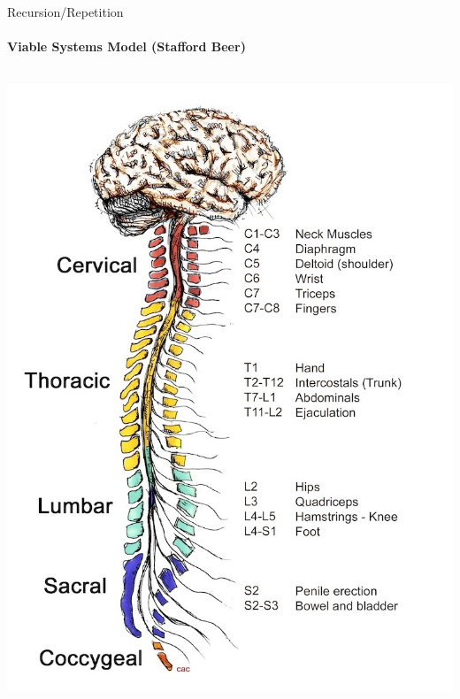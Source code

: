 \documentclass[
	11pt,
	aspectratio=169,
]{beamer}
\begin{document}
                \begin{frame}{Recursion/Repetition}
                    \framesubtitle{Viable Systems Model (Stafford Beer)}
                    \begin{columns}
                         \centering\includegraphics[height=0.8\textheight]{resources/brain_spinalCord.jpg}

\end{columns}
\end{frame}
\end{document}
